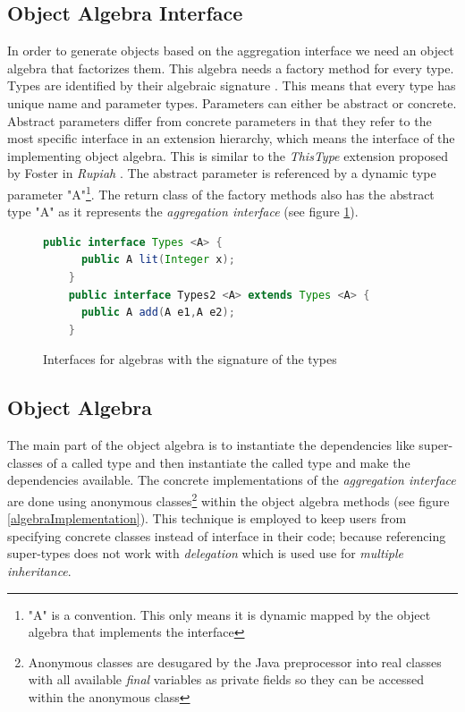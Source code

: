 \documentclass{report}
\begin{document}
\subsection{Object Algebra Interface}

\label{abstractParameter}

In order to generate objects based on the aggregation interface we need an object algebra that factorizes them. This algebra needs a factory method for every type. Types are identified by their algebraic signature \cite{Oliv-Extensibility-2012}. This means that every type has unique name and parameter types. Parameters can either be abstract or concrete. Abstract parameters differ from concrete parameters in that they refer to the most specific interface in an extension hierarchy, which means the interface of the implementing object algebra. This is similar to the \emph{ThisType} extension proposed by Foster in \emph{Rupiah} \cite{Foster-Rupiah-2001}. The abstract parameter is referenced by a dynamic type parameter "A"\footnote{"A" is a convention. This only means it is dynamic mapped by the object algebra that implements the interface}. The return class of the factory methods also has the abstract type "A" as it represents the \emph{aggregation interface} (see figure \ref{algebraInterfaces}).

\begin{figure}[h]
\begin{lstlisting}[language=java]
    public interface Types <A> {
      public A lit(Integer x);
    }
    public interface Types2 <A> extends Types <A> {
      public A add(A e1,A e2);
    }
\end{lstlisting}
\caption{Interfaces for algebras with the signature of the types}
\label{algebraInterfaces}
\end{figure}

\subsection{Object Algebra}

The main part of the object algebra is to instantiate the dependencies like super-classes of a called type and then instantiate the called type and make the dependencies available. The concrete implementations of the \emph{aggregation interface} are done using anonymous classes\footnote{Anonymous classes are desugared by the Java preprocessor into real classes with all available \emph{final} variables as private fields so they can be accessed within the anonymous class} within the object algebra methods (see figure \ref{algebraImplementation}). This technique is employed to keep users from specifying concrete classes instead of interface in their code; because referencing super-types does not work with \emph{delegation} which is used use for \emph{multiple inheritance}.
\end{document}
